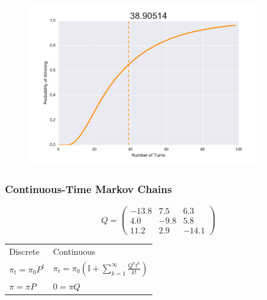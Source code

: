 \documentclass{beamer}
\begin{document}
\begin{frame}
\begin{figure}
  \includegraphics[width=0.9\textwidth]{snakesladdersabs}
\end{figure}
\end{frame}



\begin{frame}
\frametitle{Continuous-Time Markov Chains}
\begin{figure}
  
\end{figure}
\end{frame}

\begin{frame}
\huge{
\begin{equation*}
 Q =  \left( \begin{array}{ccc}
-13.8 & 7.5 & 6.3 \\
4.0 & -9.8 & 5.8 \\
11.2 & 2.9 & -14.1 \end{array} \right)
\end{equation*}
}
\end{frame}



\begin{frame}
\begin{center}
\begin{tabular}{p{3cm}|p{5.5cm}}
\Large Discrete & \Large Continuous \\[5ex]
\Large $ \pi_t = \pi_0P^{t} $ & \Large $ \pi_t = \pi_0\left(\mathbb{I} + \sum_{k=1}^{\infty}\frac{Q^kt^k}{k!}\right) $ \\[5ex]
\Large $ \pi = \pi P $ & \Large $ 0 = \pi Q $ \\[5ex]
\end{tabular}
\end{center}
\end{frame}
\end{document}

